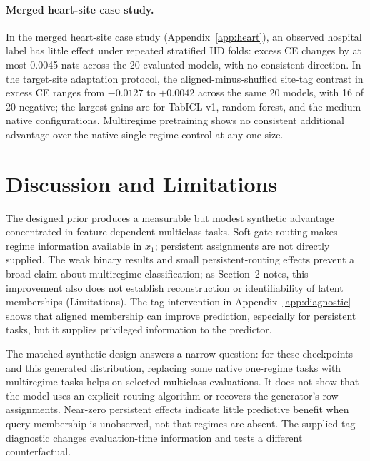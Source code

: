 \documentclass{article}
\begin{document}
\paragraph{Merged heart-site case study.} In the merged heart-site case study (Appendix~\ref{app:heart}), an observed hospital label has little effect under repeated stratified IID folds: excess CE changes by at most 0.0045 nats across the 20 evaluated models, with no consistent direction. In the target-site adaptation protocol, the aligned-minus-shuffled site-tag contrast in excess CE ranges from $-0.0127$ to $+0.0042$ across the same 20 models, with 16 of 20 negative; the largest gains are for TabICL v1, random forest, and the medium native configurations. Multiregime pretraining shows no consistent additional advantage over the native single-regime control at any one size.

\FloatBarrier
\section{Discussion and Limitations}
The designed prior produces a measurable but modest synthetic advantage concentrated in feature-dependent multiclass tasks. Soft-gate routing makes regime information available in $x_1$; persistent assignments are not directly supplied. The weak binary results and small persistent-routing effects prevent a broad claim about multiregime classification; as Section~2 notes, this improvement also does not establish reconstruction or identifiability of latent memberships (Limitations). The tag intervention in Appendix~\ref{app:diagnostic} shows that aligned membership can improve prediction, especially for persistent tasks, but it supplies privileged information to the predictor.

The matched synthetic design answers a narrow question: for these checkpoints and this generated distribution, replacing some native one-regime tasks with multiregime tasks helps on selected multiclass evaluations. It does not show that the model uses an explicit routing algorithm or recovers the generator's row assignments. Near-zero persistent effects indicate little predictive benefit when query membership is unobserved, not that regimes are absent. The supplied-tag diagnostic changes evaluation-time information and tests a different counterfactual.
\end{document}
